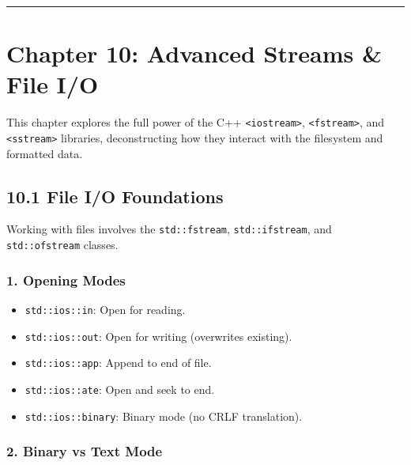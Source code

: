 \begin{center}\rule{0.5\linewidth}{0.5pt}\end{center}

\hypertarget{chapter-10-advanced-streams-file-io}{%
\chapter{Chapter 10: Advanced Streams \& File
I/O}\label{chapter-10-advanced-streams-file-io}}

This chapter explores the full power of the C++
\passthrough{\lstinline!<iostream>!},
\passthrough{\lstinline!<fstream>!}, and
\passthrough{\lstinline!<sstream>!} libraries, deconstructing how they
interact with the filesystem and formatted data.

\hypertarget{file-io-foundations}{%
\section{10.1 File I/O Foundations}\label{file-io-foundations}}

Working with files involves the \passthrough{\lstinline!std::fstream!},
\passthrough{\lstinline!std::ifstream!}, and
\passthrough{\lstinline!std::ofstream!} classes.

\hypertarget{opening-modes}{%
\subsection{1. Opening Modes}\label{opening-modes}}

\begin{itemize}
\tightlist
\item
  \passthrough{\lstinline!std::ios::in!}: Open for reading.
\item
  \passthrough{\lstinline!std::ios::out!}: Open for writing (overwrites
  existing).
\item
  \passthrough{\lstinline!std::ios::app!}: Append to end of file.
\item
  \passthrough{\lstinline!std::ios::ate!}: Open and seek to end.
\item
  \passthrough{\lstinline!std::ios::binary!}: Binary mode (no CRLF
  translation).
\end{itemize}

\hypertarget{binary-vs-text-mode}{%
\subsection{2. Binary vs Text Mode}\label{binary-vs-text-mode}}

